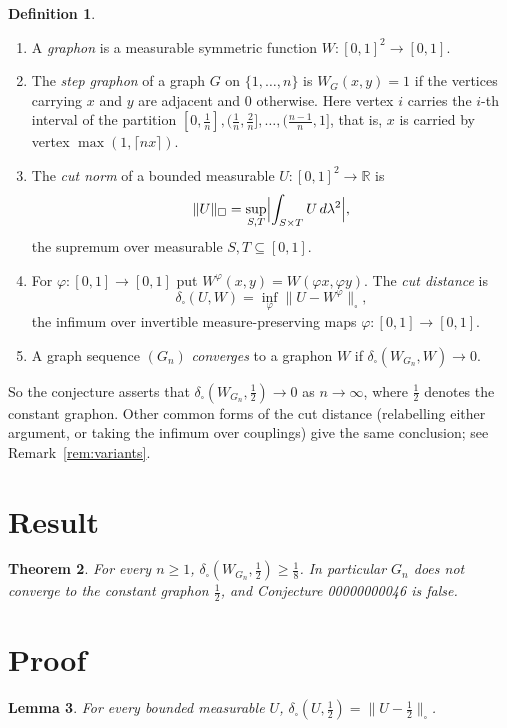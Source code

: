 \documentclass[11pt]{article}
\theoremstyle{plain}
\newtheorem{theorem}{Theorem}
\newtheorem{lemma}[theorem]{Lemma}
\theoremstyle{definition}
\newtheorem{definition}[theorem]{Definition}
\theoremstyle{remark}
\newcommand{\cut}{\square}
\newcommand{\dcut}{\delta_\square}
\begin{document}
\begin{definition}
\begin{enumerate}
\item A \emph{graphon} is a measurable symmetric function
  $W\colon[0,1]^2\to[0,1]$.
\item The \emph{step graphon} of a graph $G$ on $\{1,\ldots,n\}$ is
  $W_G(x,y)=1$ if the vertices carrying $x$ and $y$ are adjacent and $0$
  otherwise. Here vertex $i$ carries the $i$-th interval of the partition
  $[0,\tfrac1n],(\tfrac1n,\tfrac2n],\ldots,(\tfrac{n-1}n,1]$, that is, $x$ is
  carried by vertex $\max(1,\lceil nx\rceil)$.
\item The \emph{cut norm} of a bounded measurable $U\colon[0,1]^2\to\mathbb R$
  is
  \[
    \|U\|_\cut=\sup_{S,T}\Bigl|\int_{S\times T}U\,d\lambda^2\Bigr|,
  \]
  the supremum over measurable $S,T\subseteq[0,1]$.
\item For $\varphi\colon[0,1]\to[0,1]$ put $W^\varphi(x,y)=W(\varphi x,\varphi y)$.
  The \emph{cut distance} is
  \[
    \dcut(U,W)=\inf_\varphi\|U-W^\varphi\|_\cut ,
  \]
  the infimum over invertible measure-preserving maps
  $\varphi\colon[0,1]\to[0,1]$.
\item A graph sequence $(G_n)$ \emph{converges} to a graphon $W$ if
  $\dcut(W_{G_n},W)\to0$.
\end{enumerate}
\end{definition}

So the conjecture asserts that $\dcut(W_{G_n},\tfrac12)\to0$ as $n\to\infty$,
where $\tfrac12$ denotes the constant graphon. Other common forms of the cut
distance (relabelling either argument, or taking the infimum over couplings)
give the same conclusion; see Remark~\ref{rem:variants}.

\section{Result}

\begin{theorem}\label{thm:main}
For every $n\ge1$, $\dcut(W_{G_n},\tfrac12)\ge\tfrac18$. In particular $G_n$
does not converge to the constant graphon $\tfrac12$, and Conjecture
00000000046 is false.
\end{theorem}

\section{Proof}

\begin{lemma}\label{lem:const}
For every bounded measurable $U$, $\dcut(U,\tfrac12)=\|U-\tfrac12\|_\cut$.
\end{lemma}
\end{document}

